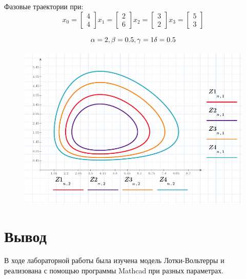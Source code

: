 \documentclass[a4paper, 14pt]{extarticle}
\begin{document}
		Фазовые траектории при:
		\noindent \[
					x_0 = \begin{bmatrix} 4 \\ 4 \end{bmatrix}
					x_1 = \begin{bmatrix} 2 \\ 6 \end{bmatrix} 
					x_2 = \begin{bmatrix} 3 \\ 2 \end{bmatrix} 
					x_3 = \begin{bmatrix} 5 \\ 3 \end{bmatrix} 
					\]
		
		\noindent\[
		\alpha = 2,\\
		\beta = 0.5,\\
		\gamma = 1\\
		\delta = 0.5
		\]
		\begin{figure}[H]
			\centering
			\includegraphics[width = \linewidth]{6.pdf}
			\caption[.] {}
		\end{figure}
	
	\section{Вывод}
		В ходе лабораторной работы была изучена модель Лотки-Вольтерры и реализована с помощью программы
		Mathcad при разных параметрах. 
		
\end{document}
